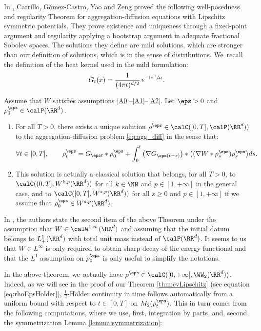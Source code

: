 In \cite{carrilloAsymptotic21}, Carrillo, Gómez-Castro, Yao and Zeng proved the following well-posedness and regularity Theorem for aggregation-diffusion equations with Lipschitz symmetric potentials. They prove existence and uniqueness through a ﬁxed-point argument and regularity applying a bootstrap argument in adequate fractional Sobolev spaces. The solutions they define are mild solutions, which are stronger than our definition of solutions, which is in the sense of distributions. We~recall the definition of the heat kernel used in the mild formulation:
\[
G_t(x) = \frac{1}{(4\pi t)^{d/2}}\, e^{-\sfrac{|x|^2}{4t}}.
\]
\begin{theorem}\label{thm:agg_diff:WP}
Assume that $W$ satisfies assumptions \eqref{A0}--\eqref{A1}--\eqref{A2}. Let $\eps > 0$ and $\rho_0^\eps \in \calP(\RR^d)$.
\begin{enumerate}
\item For all $T>0$, there exists a unique solution $\rho^\eps \in \calC([0,T], \calP(\RR^d))$ to the aggregation-diffusion problem \eqref{eq:agg_diff} in the sense that:
\[
\forall t \in [0,T], \qquad \rho_t^\eps = G_{\eps t} * \rho_0^\eps + \int_0^t \big(\nabla G_{\eps(t-s)}\big) * \big((\nabla W * \rho_s^\eps) \rho_s^\eps\big) ds.
\]
\item This solution is actually a classical solution that belongs, for all $T>0$, to $\calC((0,T], W^{k,p}(\RR^d))$ for all $k \in \NN$ and $p \in [1,+\infty]$ in the general case, and to $\calC([0,T], W^{s,p}(\RR^d))$ for all $s \geq 0$ and $p \in [1,+\infty]$ if we assume that $\rho_0^\eps \in W^{s,p}(\RR^d)$.
\end{enumerate}
\end{theorem}
\begin{remark}
In \cite{carrilloAsymptotic21}, the authors state the second item of the above Theorem under the assumption that $W \in \calW^{1,\infty}(\RR^d)$ and assuming that the initial datum belongs to $L^1_+(\RR^d)$ with total unit mass instead of $\calP(\RR^d)$. It seems to us that $W \in L^\infty$ is only required to obtain sharp decay of the energy functional and that the $L^1$ assumption on $\rho_0^\eps$ is only useful to simplify the notations.
\end{remark}
In the above theorem, we~actually have $\rho^\eps \in \calC([0,+\infty[, \WW_2(\RR^d))$. Indeed, as we will see in the proof of our Theorem \ref{thm:cvLipschitz} (see equation \eqref{eq:rhoEpsHolder}), $\frac 12$-Hölder continuity in time follows automatically from a uniform bound with respect to $t \in [0,T]$ on $M_2(\rho_t^\eps)$. This in turn comes from the following computations, where we use, first, integration by parts, and, second, the symmetrization Lemma \ref{lemma:symmetrization}:
